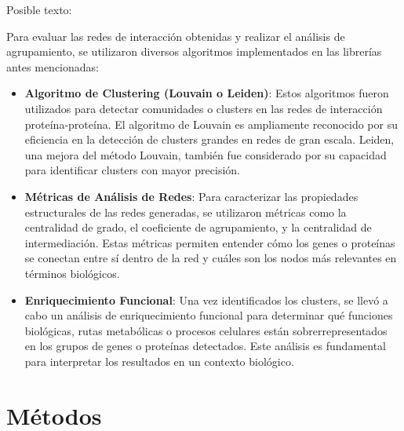 Posible texto:

Para evaluar las redes de interacción obtenidas y realizar el análisis de agrupamiento, se utilizaron diversos algoritmos implementados en las librerías antes mencionadas:

\begin{itemize}
	\item \textbf{Algoritmo de Clustering (Louvain o Leiden)}: Estos algoritmos fueron utilizados para detectar comunidades o clusters en las redes de interacción proteína-proteína. El algoritmo de Louvain es ampliamente reconocido por su eficiencia en la detección de clusters grandes en redes de gran escala. Leiden, una mejora del método Louvain, también fue considerado por su capacidad para identificar clusters con mayor precisión.
	
	\item \textbf{Métricas de Análisis de Redes}: Para caracterizar las propiedades estructurales de las redes generadas, se utilizaron métricas como la centralidad de grado, el coeficiente de agrupamiento, y la centralidad de intermediación. Estas métricas permiten entender cómo los genes o proteínas se conectan entre sí dentro de la red y cuáles son los nodos más relevantes en términos biológicos.
	
	\item \textbf{Enriquecimiento Funcional}: Una vez identificados los clusters, se llevó a cabo un análisis de enriquecimiento funcional para determinar qué funciones biológicas, rutas metabólicas o procesos celulares están sobrerrepresentados en los grupos de genes o proteínas detectados. Este análisis es fundamental para interpretar los resultados en un contexto biológico.
\end{itemize}


\section{Métodos}